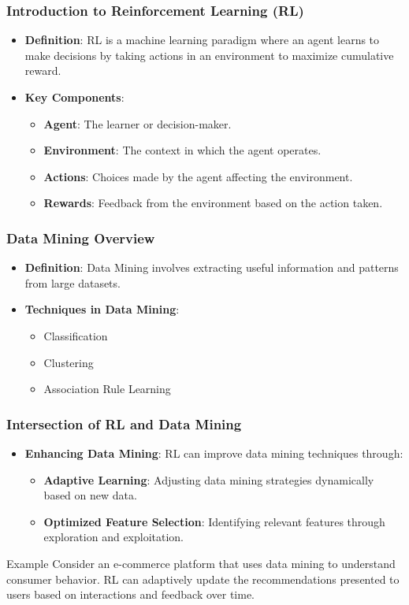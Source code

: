 \documentclass[aspectratio=169]{beamer}
\begin{document}
\begin{frame}[fragile]
    \frametitle{Introduction to Reinforcement Learning (RL)}
    \begin{itemize}
        \item \textbf{Definition}: RL is a machine learning paradigm where an agent learns to make decisions by taking actions in an environment to maximize cumulative reward.
        \item \textbf{Key Components}:
        \begin{itemize}
            \item \textbf{Agent}: The learner or decision-maker.
            \item \textbf{Environment}: The context in which the agent operates.
            \item \textbf{Actions}: Choices made by the agent affecting the environment.
            \item \textbf{Rewards}: Feedback from the environment based on the action taken.
        \end{itemize}
    \end{itemize}
\end{frame}

\begin{frame}[fragile]
    \frametitle{Data Mining Overview}
    \begin{itemize}
        \item \textbf{Definition}: Data Mining involves extracting useful information and patterns from large datasets.
        \item \textbf{Techniques in Data Mining}:
        \begin{itemize}
            \item Classification
            \item Clustering
            \item Association Rule Learning
        \end{itemize}
    \end{itemize}
\end{frame}

\begin{frame}[fragile]
    \frametitle{Intersection of RL and Data Mining}
    \begin{itemize}
        \item \textbf{Enhancing Data Mining}: RL can improve data mining techniques through:
        \begin{itemize}
            \item \textbf{Adaptive Learning}: Adjusting data mining strategies dynamically based on new data.
            \item \textbf{Optimized Feature Selection}: Identifying relevant features through exploration and exploitation.
        \end{itemize}
    \end{itemize}
    \begin{block}{Example}
        Consider an e-commerce platform that uses data mining to understand consumer behavior. RL can adaptively update the recommendations presented to users based on interactions and feedback over time.
    \end{block}
\end{frame}
\end{document}

